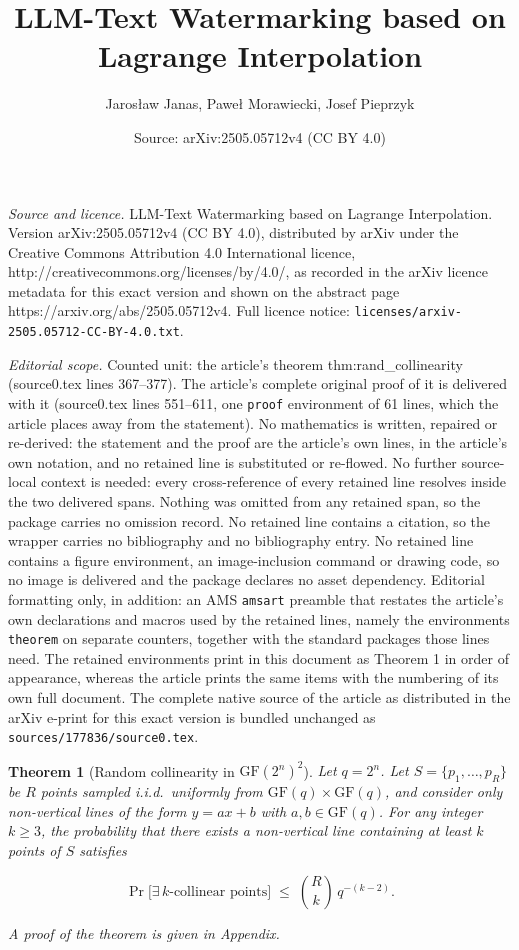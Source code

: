 \documentclass[10pt,a4paper]{amsart}
\title{LLM-Text Watermarking based on Lagrange Interpolation}
\author{Jaros{\l}aw Janas, Pawe{\l} Morawiecki, Josef Pieprzyk}
\date{Source: arXiv:2505.05712v4 (CC BY 4.0)}
\newtheorem{theorem}{Theorem}
\begin{document}
\maketitle

\noindent\emph{Source and licence.} LLM-Text Watermarking based on Lagrange Interpolation. Version arXiv:2505.05712v4 (CC BY 4.0), distributed by arXiv under the Creative Commons Attribution 4.0 International licence, http://creativecommons.org/licenses/by/4.0/, as recorded in the arXiv licence metadata for this exact version and shown on the abstract page https://arxiv.org/abs/2505.05712v4. Full licence notice: \texttt{licenses/arxiv-2505.05712-CC-BY-4.0.txt}.\par\smallskip

\noindent\textit{Editorial scope.} Counted unit: the article's theorem thm:rand\_collinearity (source0.tex lines 367--377). The article's complete original proof of it is delivered with it (source0.tex lines 551--611, one \texttt{proof} environment of 61 lines, which the article places away from the statement). No mathematics is written, repaired or re-derived: the statement and the proof are the article's own lines, in the article's own notation, and no retained line is substituted or re-flowed.  No further source-local context is needed: every cross-reference of every retained line resolves inside the two delivered spans.  Nothing was omitted from any retained span, so the package carries no omission record.  No retained line contains a citation, so the wrapper carries no bibliography and no bibliography entry.  No retained line contains a figure environment, an image-inclusion command or drawing code, so no image is delivered and the package declares no asset dependency.  Editorial formatting only, in addition: an AMS \texttt{amsart} preamble that restates the article's own declarations and macros used by the retained lines, namely the environments \texttt{theorem} on separate counters, together with the standard packages those lines need.  The retained environments print in this document as Theorem 1 in order of appearance, whereas the article prints the same items with the numbering of its own full document.  The complete native source of the article as distributed in the arXiv e-print for this exact version is bundled unchanged as \texttt{sources/177836/source0.tex}.
\begin{theorem}[Random collinearity in $\mathrm{GF}(2^n)^2$]\label{thm:rand_collinearity}
Let $q = 2^n$. Let $S=\{p_1,\ldots,p_R\}$ be $R$ points sampled i.i.d.\ uniformly from $\mathrm{GF}(q)\times\mathrm{GF}(q)$, and consider only non-vertical lines of the form $y=ax+b$ with $a,b\in\mathrm{GF}(q)$. For any integer $k\ge 3$, the probability that there exists a non-vertical line containing at least $k$ points of $S$ satisfies

\[
    \Pr\big[\exists\, k\text{-collinear points}\big]
    \;\le\;
    \binom{R}{k}\, q^{-(k-2)}.
\]

A proof of the theorem is given in Appendix.
\end{theorem}
\end{document}
